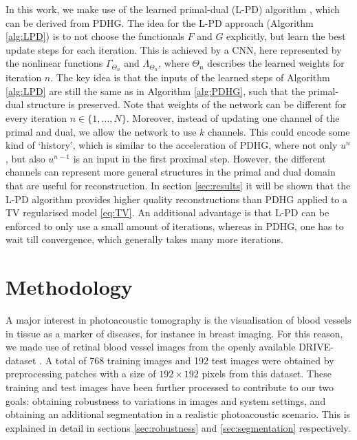 \documentclass[journal]{IEEEtran}
\begin{document}
In this work, we make use of the learned primal-dual (L-PD) algorithm \cite{Adler2018}, which can be derived from PDHG. The idea for the L-PD approach (Algorithm \ref{alg:LPD}) is to not choose the functionals $F$ and $G$ explicitly, but learn the best update steps for each iteration. This is achieved by a CNN, here represented by the nonlinear functions $\Gamma_{\Theta_n}$ and $\Lambda_{\Theta_n}$, where $\Theta_n$ describes the learned weights for iteration $n$. The key idea is that the inputs of the learned steps of Algorithm \ref{alg:LPD} are still the same as in Algorithm \ref{alg:PDHG}, such that the primal-dual structure is preserved. Note that weights of the network can be different for every iteration $n\in\{1,\dots,N\}$. Moreover, instead of updating one channel of the primal and dual, we allow the network to use $k$ channels. This could encode some kind of `history', which is similar to the acceleration of PDHG, where not only $u^n$, but also $u^{n-1}$ is an input in the first proximal step. However, the different channels can represent more general structures in the primal and dual domain that are useful for reconstruction. In section \ref{sec:results} it will be shown that the L-PD algorithm provides higher quality reconstructions than PDHG applied to a TV regularised model \eqref{eq:TV}. An additional advantage is that L-PD can be enforced to only use a small amount of iterations, whereas in PDHG, one has to wait till convergence, which generally takes many more iterations. 

\section{Methodology}\label{sec:experiments}
A major interest in photoacoustic tomography is the visualisation of blood vessels in tissue as a marker of diseases, for instance in breast imaging. For this reason, we made use of retinal blood vessel images from the openly available DRIVE-dataset \cite{Staal2004}. A total of 768 training images and 192 test images were obtained by preprocessing patches with a size of $192\times192$ pixels from this dataset. These training and test images have been further processed to contribute to our two goals: obtaining robustness to variations in images and system settings, and obtaining an additional segmentation in a realistic photoacoustic scenario. This is explained in detail in sections \ref{sec:robustness} and \ref{sec:segmentation} respectively.
\end{document}

